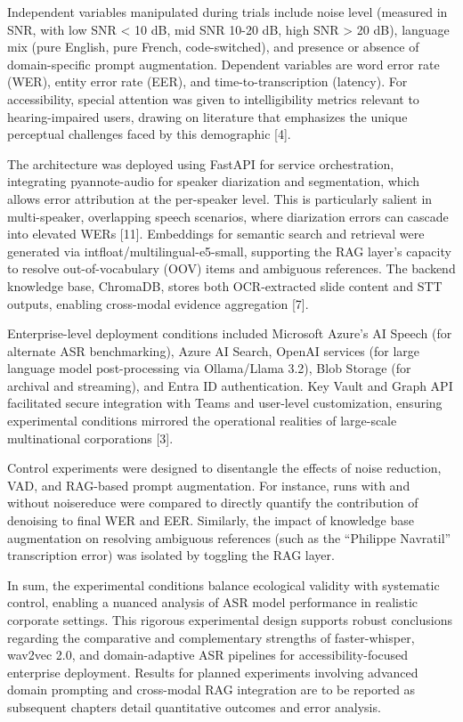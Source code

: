 \documentclass[12pt,a4paper]{article}
\begin{document}
Independent variables manipulated during trials include noise level (measured in SNR, with low SNR < 10 dB, mid SNR 10-20 dB, high SNR > 20 dB), language mix (pure English, pure French, code-switched), and presence or absence of domain-specific prompt augmentation. Dependent variables are word error rate (WER), entity error rate (EER), and time-to-transcription (latency). For accessibility, special attention was given to intelligibility metrics relevant to hearing-impaired users, drawing on literature that emphasizes the unique perceptual challenges faced by this demographic [4].


The architecture was deployed using FastAPI for service orchestration, integrating pyannote-audio for speaker diarization and segmentation, which allows error attribution at the per-speaker level. This is particularly salient in multi-speaker, overlapping speech scenarios, where diarization errors can cascade into elevated WERs [11]. Embeddings for semantic search and retrieval were generated via intfloat/multilingual-e5-small, supporting the RAG layer’s capacity to resolve out-of-vocabulary (OOV) items and ambiguous references. The backend knowledge base, ChromaDB, stores both OCR-extracted slide content and STT outputs, enabling cross-modal evidence aggregation [7].


Enterprise-level deployment conditions included Microsoft Azure’s AI Speech (for alternate ASR benchmarking), Azure AI Search, OpenAI services (for large language model post-processing via Ollama/Llama 3.2), Blob Storage (for archival and streaming), and Entra ID authentication. Key Vault and Graph API facilitated secure integration with Teams and user-level customization, ensuring experimental conditions mirrored the operational realities of large-scale multinational corporations [3].


Control experiments were designed to disentangle the effects of noise reduction, VAD, and RAG-based prompt augmentation. For instance, runs with and without noisereduce were compared to directly quantify the contribution of denoising to final WER and EER. Similarly, the impact of knowledge base augmentation on resolving ambiguous references (such as the “Philippe Navratil” transcription error) was isolated by toggling the RAG layer.


In sum, the experimental conditions balance ecological validity with systematic control, enabling a nuanced analysis of ASR model performance in realistic corporate settings. This rigorous experimental design supports robust conclusions regarding the comparative and complementary strengths of faster-whisper, wav2vec 2.0, and domain-adaptive ASR pipelines for accessibility-focused enterprise deployment. Results for planned experiments involving advanced domain prompting and cross-modal RAG integration are to be reported as subsequent chapters detail quantitative outcomes and error analysis.
\end{document}
